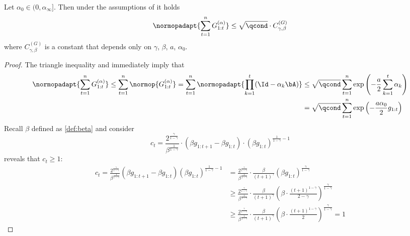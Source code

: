 \begin{proposition}
    \label{prop:bound_sum_g_1t}
    Let $\alpha_0 \in (0, \alpha_{\infty}]$. Then under the assumptions of  it holds
    \begin{equation}
        \label{bound:norm:sum:G1n}
        \normopadapt{\sum_{t=1}^n G_{1:t}^{(\alpha)}} \leq \sqrt{\qcond} \cdot  C_{\gamma, \beta}^{(G)}
    \end{equation}
    where $C_{\gamma, \beta}^{(G)}$ is a constant that depends only on $\gamma$, $\beta$, $a$, $\alpha_0$.
\end{proposition}

\begin{proof}
    The triangle inequality and {}
     immediately imply that
    \begin{align}
        \label{proof:Gnm:first:bound}
        \normopadapt{\sum_{t=1}^n G_{1:t}^{(\alpha)}} \leq \sum_{t=1}^n \normop{G_{1:t}^{(\alpha)}} = \sum_{t=1}^n \normopadapt{\prod_{k=1}^t (\Id - \alpha_k \bA)} &\leq \sqrt{\qcond} \sum_{t=1}^n \exp\left(- \frac{a}{2}\sum_{k=1}^t \alpha_k\right) \\ &= \sqrt{\qcond}
        \sum_{t=1}^n \exp\left(- \frac{a \alpha_0}{2}g_{1:t}\right)
    \end{align}
    Recall $\beta$ defined as \eqref{def:beta} and consider 
    \begin{equation}
        c_t = \frac{2^{\frac{\gamma}{1-\gamma}}}{\beta^{\frac{1}{1-\gamma}}} \cdot (\beta g_{1:t+1} - \beta g_{1:t}) \cdot (\beta g_{1:t})^{\frac{1}{1-\gamma} - 1}
    \end{equation}
    {} reveals that $c_t \geq 1$:
    \begin{align}
        c_t = \frac{2^{\frac{\gamma}{1-\gamma}}}{\beta^{\frac{1}{1-\gamma}}} (\beta g_{1:t+1} - \beta g_{1:t}) (\beta g_{1:t})^{\frac{1}{1-\gamma} - 1} &= \frac{2^{\frac{\gamma}{1-\gamma}}}{\beta^{\frac{1}{1-\gamma}}} \cdot\frac{\beta}{(t+1)^{\gamma}} \left(\beta g_{1:t}\right)^{\frac{\gamma}{1-\gamma}} \\ &\geq \frac{2^{\frac{\gamma}{1-\gamma}}}{\beta^{\frac{1}{1-\gamma}}} \cdot\frac{\beta}{(t+1)^{\gamma}} \left(\beta \cdot \frac{(t+1)^{1-\gamma}}{2 - \gamma}\right)^{\frac{\gamma}{1-\gamma}} \\ &\geq  \frac{2^{\frac{\gamma}{1-\gamma}}}{\beta^{\frac{1}{1-\gamma}}} \cdot \frac{\beta}{(t+1)^{\gamma}} \left(\beta \cdot \frac{(t+1)^{1-\gamma}}{2}\right)^{\frac{\gamma}{1-\gamma}}= 1
    \end{align}

\end{proof}
